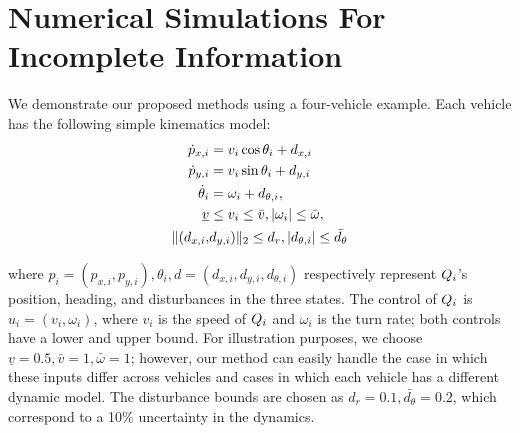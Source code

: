 \section{Numerical Simulations For Incomplete Information \label{sec:sim_dstb}}
We demonstrate our proposed methods using a four-vehicle example. Each vehicle has the following simple kinematics model:
\begin{equation}
\label{eq:dyn_i}
\begin{aligned}
\dot{\pos}_{x,i} &= v_i \cos \theta_i + d_{x,i} \\
\dot{\pos}_{y,i} &= v_i \sin \theta_i + d_{y,i}\\
\dot{\theta}_i &= \omega_i + d_{\theta,i}, \\
\underline{v} & \le v_i \le \bar{v}, |\omega_i| \le \bar{\omega},\\
\|(d_{x,i}, & d_{y,i}) \|_2 \le d_{r}, |d_{\theta,i}| \le \bar{d_{\theta}}
\end{aligned}
\end{equation}

\noindent where $p_i = (p_{x,i}, p_{y,i}), \theta_i, d = (d_{x,i}, d_{y,i}, d_{\theta,i})$ respectively represent $Q_i$'s position, heading, and disturbances in the three states. The control of $Q_i$ is $u_i = (v_i, \omega_i)$, where $v_i$ is the speed of $Q_i$ and $\omega_i$ is the turn rate; both controls have a lower and upper bound. For illustration purposes, we choose $\underline{v} = 0.5, \bar{v} = 1, \bar\omega = 1$; however, our method can easily handle the case in which these inputs differ across vehicles and cases in which each vehicle has a different dynamic model. The disturbance bounds are chosen as $d_{r} = 0.1, \bar{d_{\theta}} = 0.2$, which correspond to a 10\% uncertainty in the dynamics. %

%

